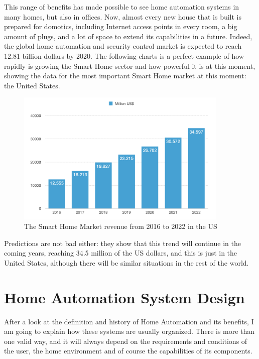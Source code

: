 This range of benefits has made possible to see home automation systems in many homes, but also in offices. Now, almost 
every new house that is built is prepared for domotics, including Internet access points in every room, a big amount of plugs, 
and a lot of space to extend its capabilities in a future. Indeed, the global home automation and security control market is 
expected to reach 12.81 billion dollars by 2020.\cite{reutersResearchMarkets} The following charts is a perfect example of how 
rapidly is growing the Smart Home sector and how powerful it is at this moment, showing the data for the most important Smart
Home market at this moment: the United States.

\begin{figure}
	\centering
	\includegraphics[width=0.9\textwidth]{images/Chapter_02/sh-market-revenue.png}
	\caption{The Smart Home Market revenue from 2016 to 2022 in the US\cite{statistaSmartHomeUS}}
	\label{fig:sh-market-revenue}
\end{figure}

Predictions are not bad either: they show that this trend will continue in the coming years, reaching 34.5 million of the 
US dollars, and this is just in the United States, although there will be similar situations in the rest of the world.

\section{Home Automation System Design}
After a look at the definition and history of Home Automation and its benefits, I am going to explain how these systems are 
usually organized. There is more than one valid way, and it will always depend on the requirements and conditions of the user,
the home environment and of course the capabilities of its components. 

